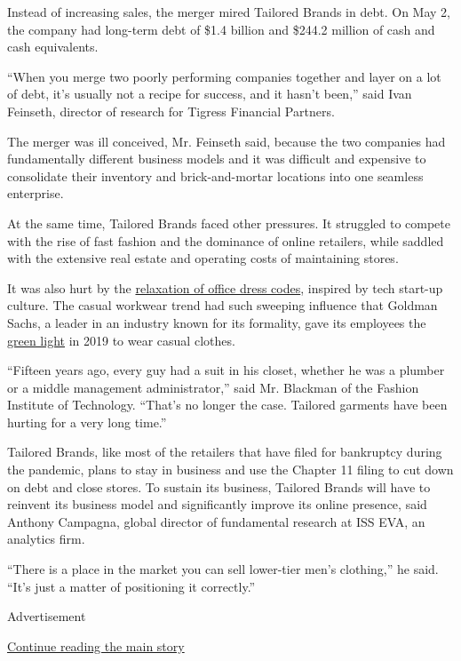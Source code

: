 Instead of increasing sales, the merger mired Tailored Brands in debt.
On May 2, the company had long-term debt of \$1.4 billion and \$244.2
million of cash and cash equivalents.

``When you merge two poorly performing companies together and layer on a
lot of debt, it's usually not a recipe for success, and it hasn't
been,'' said Ivan Feinseth, director of research for Tigress Financial
Partners.

The merger was ill conceived, Mr. Feinseth said, because the two
companies had fundamentally different business models and it was
difficult and expensive to consolidate their inventory and
brick-and-mortar locations into one seamless enterprise.

At the same time, Tailored Brands faced other pressures. It struggled to
compete with the rise of fast fashion and the dominance of online
retailers, while saddled with the extensive real estate and operating
costs of maintaining stores.

It was also hurt by the
\href{https://www.nytimes.com/2016/05/26/fashion/office-fashion-uniforms.html}{relaxation
of office dress codes}, inspired by tech start-up culture. The casual
workwear trend had such sweeping influence that Goldman Sachs, a leader
in an industry known for its formality, gave its employees the
\href{https://www.nytimes.com/2019/03/06/business/dealbook/goldman-sachs-dress-code.html}{green
light} in 2019 to wear casual clothes.

``Fifteen years ago, every guy had a suit in his closet, whether he was
a plumber or a middle management administrator,'' said Mr. Blackman of
the Fashion Institute of Technology. ``That's no longer the case.
Tailored garments have been hurting for a very long time.''

Tailored Brands, like most of the retailers that have filed for
bankruptcy during the pandemic, plans to stay in business and use the
Chapter 11 filing to cut down on debt and close stores. To sustain its
business, Tailored Brands will have to reinvent its business model and
significantly improve its online presence, said Anthony Campagna, global
director of fundamental research at ISS EVA, an analytics firm.

``There is a place in the market you can sell lower-tier men's
clothing,'' he said. ``It's just a matter of positioning it correctly.''

Advertisement

\protect\hyperlink{after-bottom}{Continue reading the main story}

